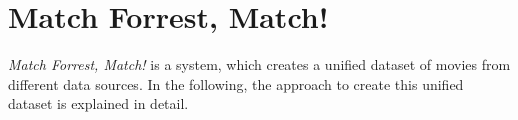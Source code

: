 \section{Match Forrest, Match!}
\label{sec_method}

\emph{Match Forrest, Match!} is a system, which creates a unified dataset of movies from different data sources.
In the following, the approach to create this unified dataset is explained in detail.






